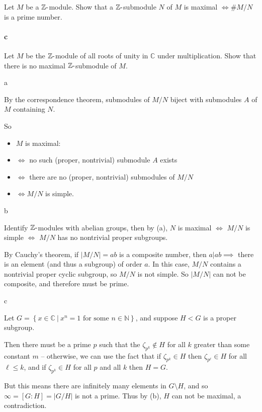 Let \(M\) be a \({\mathbb{Z}}{\hbox{-}}\)module. Show that a
\({\mathbb{Z}}{\hbox{-}}\)submodule \(N\) of \(M\) is maximal
\(\iff \#M /N\) is a prime number.

\hypertarget{c-48}{%
\paragraph{c}\label{c-48}}

Let \(M\) be the \({\mathbb{Z}}{\hbox{-}}\)module of all roots of unity
in \({\mathbb{C}}\) under multiplication. Show that there is no maximal
\({\mathbb{Z}}{\hbox{-}}\)submodule of \(M\).

\begin{solution}

a

By the correspondence theorem, submodules of \(M/N\) biject with
submodules \(A\) of \(M\) containing \(N\).

So

\begin{itemize}
\item
  \(M\) is maximal:
\item
  \(\iff\) no such (proper, nontrivial) submodule \(A\) exists
\item
  \(\iff\) there are no (proper, nontrivial) submodules of \(M/N\)
\item
  \(\iff M/N\) is simple.
\end{itemize}

b

Identify \({\mathbb{Z}}{\hbox{-}}\)modules with abelian groups, then by
(a), \(N\) is maximal \(\iff\) \(M/N\) is simple \(\iff\) \(M/N\) has no
nontrivial proper subgroups.

By Cauchy's theorem, if \({\left\lvert {M/N} \right\rvert} = ab\) is a
composite number, then \(a\mathrel{\Big|}ab \implies\) there is an
element (and thus a subgroup) of order \(a\). In this case, \(M/N\)
contains a nontrivial proper cyclic subgroup, so \(M/N\) is not simple.
So \({\left\lvert {M/N} \right\rvert}\) can not be composite, and
therefore must be prime.

c

Let
\(G = \left\{{x \in {\mathbb{C}}{~\mathrel{\Big|}~}x^n=1 \text{ for some }n\in {\mathbb{N}}}\right\}\),
and suppose \(H < G\) is a proper subgroup.

Then there must be a prime \(p\) such that the
\(\zeta_{p^k} \not \in H\) for all \(k\) greater than some constant
\(m\) -- otherwise, we can use the fact that if \(\zeta_{p^k} \in H\)
then \(\zeta_{p^\ell} \in H\) for all \(\ell \leq k\), and if
\(\zeta_{p^k} \in H\) for all \(p\) and all \(k\) then \(H = G\).

But this means there are infinitely many elements in \(G\setminus H\),
and so \(\infty = [G: H] = {\left\lvert {G/H} \right\rvert}\) is not a
prime. Thus by (b), \(H\) can not be maximal, a contradiction.

\end{solution}

